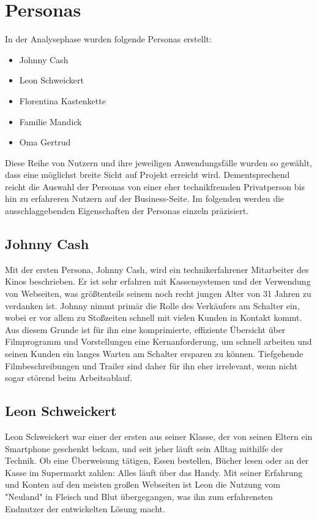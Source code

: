 \section{Personas}

In der Analysephase wurden folgende Personas erstellt:
\begin{itemize}
\item Johnny Cash
\item Leon Schweickert
\item Florentina Kastenkette
\item Familie Mandick
\item Oma Gertrud
\end{itemize}

Diese Reihe von Nutzern und ihre jeweiligen Anwendungsfälle wurden so gewählt, dass eine möglichst breite Sicht auf Projekt erreicht wird.
Dementsprechend reicht die Auswahl der Personas von einer eher technikfremden Privatperson bis hin zu erfahreren Nutzern auf der Business-Seite.
Im folgenden werden die ausschlaggebenden Eigenschaften der Personas einzeln präzisiert.


\subsection{Johnny Cash}
Mit der ersten Persona, Johnny Cash, wird ein technikerfahrener Mitarbeiter des Kinos beschrieben. Er ist sehr erfahren mit Kassensystemen und der Verwendung von Webseiten, was größtenteils seinem noch recht jungen Alter von 31 Jahren zu verdanken ist. Johnny nimmt primär die Rolle des Verkäufers am Schalter ein, wobei er vor allem zu Stoßzeiten schnell mit vielen Kunden in Kontakt kommt. Aus diesem Grunde ist für ihn eine komprimierte, effiziente Übersicht über Filmprogramm und Vorstellungen eine Kernanforderung, um schnell arbeiten und seinen Kunden ein langes Warten am Schalter ersparen zu können. Tiefgehende Filmbeschreibungen und Trailer sind daher für ihn eher irrelevant, wenn nicht sogar störend beim Arbeitsablauf. 

\subsection{Leon Schweickert}
Leon Schweickert war einer der ersten aus seiner Klasse, der von seinen Eltern ein Smartphone geschenkt bekam, und seit jeher läuft sein Alltag mithilfe der Technik. Ob eine Überweisung tätigen, Essen bestellen, Bücher lesen oder an der Kasse im Supermarkt zahlen: Alles läuft über das Handy. Mit seiner Erfahrung und Konten auf den meisten großen Webseiten ist Leon die Nutzung vom "Neuland" in Fleisch und Blut übergegangen, was ihn zum erfahrensten Endnutzer der entwickelten Lösung macht.

